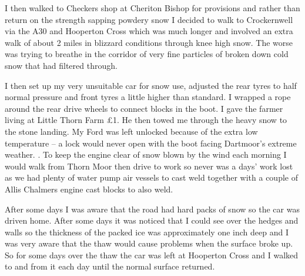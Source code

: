 I then walked to Checkers shop at Cheriton Bishop for provisions and rather than
return on the strength sapping powdery snow I decided to walk to Crockernwell
via the A30 and Hooperton Cross which was much longer and involved an extra
walk of about 2 miles in blizzard conditions through knee high snow.  The worse
was trying to breathe in the corridor of very fine particles of broken down
cold snow that had filtered through.

I then set up my very unsuitable car for snow use, adjusted the rear tyres to
half normal pressure and front tyres a little higher than standard.  I wrapped
a rope around the rear drive wheels to connect blocks in the boot.  I gave the
farmer living at Little Thorn Farm £1.  He then towed me through the heavy snow
to the stone landing.  My Ford was left unlocked because of the extra low
temperature – a lock would never open with the boot facing Dartmoor's extreme
weather.            .  To keep the engine clear of snow blown by the wind each
morning I would walk from Thorn Moor then drive to work so never was a days'
work lost as we had plenty of water pump air vessels to cast weld together with
a couple of Allis Chalmers engine cast blocks to also weld.

After some days I was aware that the road had hard packs of snow so the car was
driven home.  After some days it was noticed that I could see over the hedges
and walls so the thickness of the packed ice was approximately one inch deep
and I was very aware that the thaw would cause problems when the surface broke
up.  So for some days over the thaw the car was left at Hooperton Cross and I
walked to and from it each day until the normal surface returned.
